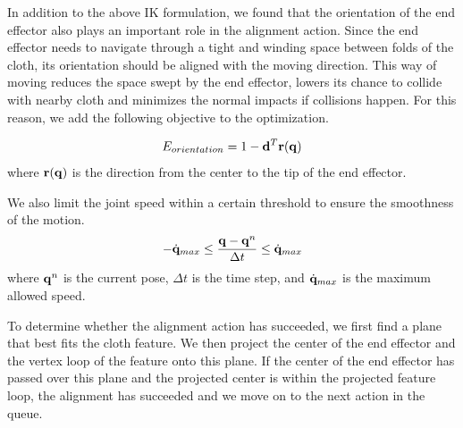 In addition to the above IK formulation, we found that the orientation of the end effector also plays an important role in the alignment action. Since the end effector needs to navigate through a tight and winding space between folds of the cloth, its orientation should be aligned with the moving direction. This way of moving reduces the space swept by the end effector, lowers its chance to collide with nearby cloth and minimizes the normal impacts if collisions happen. For this reason, we add the following objective to the optimization.

\begin{equation}
  E_{orientation} = 1-\mathbf{d}^T\mathbf{r(q})
  \label{eq:orientation}
\end{equation}
where $\mathbf{r(q)}$ is the direction from the center to the tip of the end effector.

We also limit the joint speed within a certain threshold to ensure the smoothness of the motion.
\begin{equation}
  -\dot{\mathbf{q}}_{max} \leq \frac{\mathbf{q} - \mathbf{q}^n}{\Delta t} \leq \dot{\mathbf{q}}_{max}
  \label{eq:speed}
\end{equation}
where $\mathbf{q}^n$ is the current pose, $\Delta t$ is the time step, and $\dot{\mathbf{q}}_{max}$ is the maximum allowed speed.

To determine whether the alignment action has succeeded, we first find a plane that best fits the cloth feature. We then project the center of the end effector and the vertex loop of the feature onto this plane. If the center of the end effector has passed over this plane and the projected center is within the projected feature loop, the alignment has succeeded and we move on to the next action in the queue.

